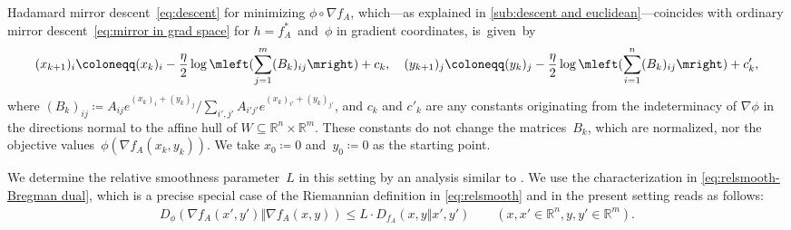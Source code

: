 \documentclass[11pt,letterpaper]{article}
\numberwithin{equation}{section}
\newcommand{\RR}{\mathbb{R}}
\begin{document}
Hadamard mirror descent~\eqref{eq:descent} for minimizing $\phi\circ\nabla f_A$, which---as explained in \cref{sub:descent and euclidean}---coincides with ordinary mirror descent~\eqref{eq:mirror in grad space} for $h=f_A^*$~and~$\phi$ in gradient coordinates, is~given~by
\begin{equation}\label{eqn:matrixscaling-mirror}
    (x_{k + 1})_i \coloneqq (x_k)_i - \frac{\eta}{2}\log\mleft({\sum_{j = 1}^m}(B_k)_{ij}\mright) + c_k,\quad (y_{k + 1})_j \coloneqq (y_k)_j - \frac{\eta}{2}\log\mleft({\sum_{i = 1}^n}(B_k)_{ij}\mright) + c'_k,
\end{equation}
where $(B_k)_{ij} \coloneqq A_{ij}e^{(x_k)_i+(y_k)_j}/\sum_{i',j'}A_{i'j'}e^{(x_k)_{i'}+(y_k)_{j'}}$, and $c_k$ and $c'_k$ are any constants originating from the indeterminacy of $\nabla\phi$ in the directions normal to the affine hull of $W \subseteq \RR^n \times \RR^m$.
These constants do not change the matrices~$B_k$, which are normalized, nor the objective values~$\phi(\nabla f_A(x_k,y_k))$.
We take $x_0\coloneqq0$ and~$y_0\coloneqq0$ as the starting point.

We determine the relative smoothness parameter~$L$ in this setting by an analysis similar to \cite{raus2024accelerated}.
We use the characterization in \cref{eq:relsmooth-Bregman dual}, which is a precise special case of the Riemannian definition in \cref{eq:relsmooth} and in the present setting reads as follows:
\begin{align}\label{eq:matrix scaling smoothness goal}
    D_{\phi}(\nabla f_A(x',y')\Vert \nabla f_A(x,y)) \leq L \cdot D_{f_A}(x,y\Vert x',y') \qquad (x,x'\in\RR^n, y,y' \in \RR^m).
\end{align}
\end{document}
